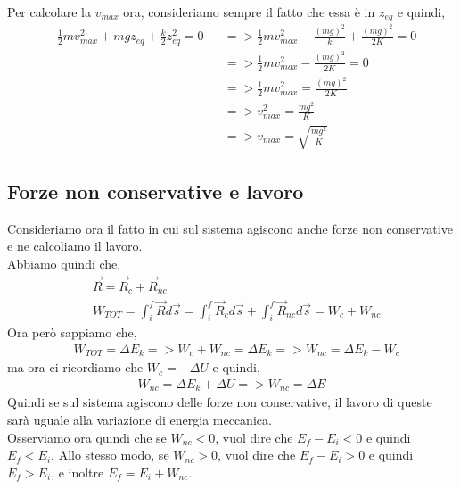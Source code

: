             Per calcolare la $v_{max}$ ora, consideriamo sempre il fatto che essa è in $z_{eq}$ e quindi,
            \begin{align*}
                &\frac{1}{2}mv_{max}^2+mg z_{eq}+\frac{k}{2}z_{eq}^2=0 &&=> \frac{1}{2}mv_{max}^2-\frac{(mg)^2}{k}+\frac{(mg)^2}{2K}=0\\
                & &&=>\frac{1}{2}mv_{max}^2-\frac{(mg)^2}{2K}=0\\
                & &&=>\frac{1}{2}mv_{max}^2=\frac{(mg)^2}{2K}\\
                & &&=>v_{max}^2=\frac{mg^2}{K}\\
                & &&=>v_{max}=\sqrt{\frac{mg^2}{K}}
            \end{align*}

    \subsection{Forze non conservative e lavoro}
        Consideriamo ora il fatto in cui sul sistema agiscono anche forze non conservative e ne calcoliamo il lavoro.\\
        Abbiamo quindi che,
        \begin{align*}
            &\vec{R}=\vec{R}_c + \vec{R}_{nc}\\
            &W_{TOT}=\int_i^f \vec{R}d\vec{s}=\int_i^f \vec{R}_cd\vec{s} + \int_i^f \vec{R}_{nc}d\vec{s}=W_c+W_{nc}
        \end{align*}
        Ora però sappiamo che,
        \begin{align*}
            &W_{TOT}=\Delta E_k=>W_c+W_{nc}=\Delta E_k=>W_{nc}=\Delta E_k - W_c
        \end{align*}
        ma ora ci ricordiamo che $W_c=-\Delta U$ e quindi,
        \begin{align*}
            W_{nc}=\Delta E_k+\Delta U=>W_{nc}=\Delta E
        \end{align*}
        Quindi se sul sistema agiscono delle forze non conservative, il lavoro di queste sarà uguale alla variazione di energia meccanica.\\
        Osserviamo ora quindi che se $W_{nc}<0$, vuol dire che $E_f-E_i<0$ e quindi $E_f<E_i$. Allo stesso modo, se $W_{nc}>0$, vuol dire che $E_f-E_i>0$ e quindi $E_f>E_i$, e inoltre $E_f=E_i+W_{nc}$.

